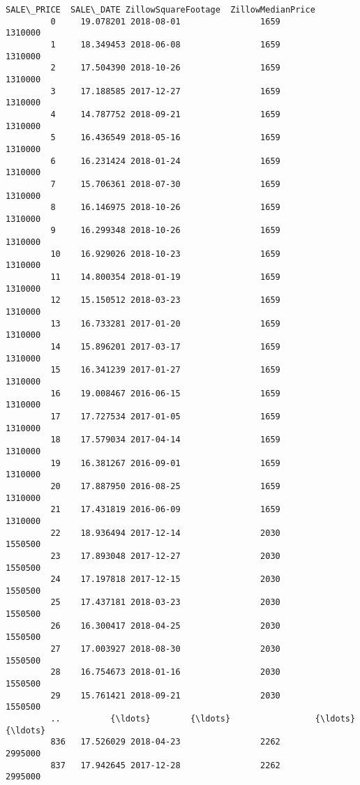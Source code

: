 \documentclass[11pt]{article}
\begin{document}
\begin{Verbatim}[commandchars=\\\{\}]
              SALE\_PRICE  SALE\_DATE ZillowSquareFootage  ZillowMedianPrice  
         0     19.078201 2018-08-01                1659            1310000  
         1     18.349453 2018-06-08                1659            1310000  
         2     17.504390 2018-10-26                1659            1310000  
         3     17.188585 2017-12-27                1659            1310000  
         4     14.787752 2018-09-21                1659            1310000  
         5     16.436549 2018-05-16                1659            1310000  
         6     16.231424 2018-01-24                1659            1310000  
         7     15.706361 2018-07-30                1659            1310000  
         8     16.146975 2018-10-26                1659            1310000  
         9     16.299348 2018-10-26                1659            1310000  
         10    16.929026 2018-10-23                1659            1310000  
         11    14.800354 2018-01-19                1659            1310000  
         12    15.150512 2018-03-23                1659            1310000  
         13    16.733281 2017-01-20                1659            1310000  
         14    15.896201 2017-03-17                1659            1310000  
         15    16.341239 2017-01-27                1659            1310000  
         16    19.008467 2016-06-15                1659            1310000  
         17    17.727534 2017-01-05                1659            1310000  
         18    17.579034 2017-04-14                1659            1310000  
         19    16.381267 2016-09-01                1659            1310000  
         20    17.887950 2016-08-25                1659            1310000  
         21    17.431819 2016-06-09                1659            1310000  
         22    18.936494 2017-12-14                2030            1550500  
         23    17.893048 2017-12-27                2030            1550500  
         24    17.197818 2017-12-15                2030            1550500  
         25    17.437181 2018-03-23                2030            1550500  
         26    16.300417 2018-04-25                2030            1550500  
         27    17.003927 2018-08-30                2030            1550500  
         28    16.754673 2018-01-16                2030            1550500  
         29    15.761421 2018-09-21                2030            1550500  
         ..          {\ldots}        {\ldots}                 {\ldots}                {\ldots}  
         836   17.526029 2018-04-23                2262            2995000  
         837   17.942645 2017-12-28                2262            2995000  

\end{Verbatim}
\end{document}
